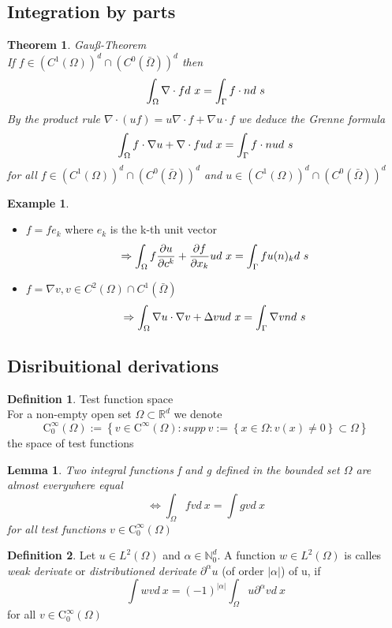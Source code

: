 \documentclass[ngerman]{article}
\newtheorem*{theorem}{Theorem}
\newtheorem*{lemma}{Lemma}
\theoremstyle{definition}
\newtheorem*{defi}{Definition}
\newtheorem*{exa}{Example}
\theoremstyle{remark}
\newcommand{\f}[2]{\frac{#1}{#2}}							%
\newcommand{\p}{\partial}
\newcommand{\NN}{\mathbb{N}}			%
\newcommand{\RR}{\mathbb{R}}			%
\renewcommand{\aa}{\alpha}		%
\newcommand{\OO}{\Omega}
\newcommand{\cinf}{\tx{C}^\infty}
\newcommand{\drw}{\Rightarrow}			%
\newcommand{\gdw}{\Leftrightarrow}	%
\newcommand{\tri}{\nabla}
\newcommand{\tx}[1]{\text{#1}}
\begin{document}
\subsection{Integration by parts}
\begin{theorem} Gau\ss{}-Theorem\\
  If $f \in(C^1(\OO))^d\cap (C^0(\bar\OO))^d$ then 
  $$\int_\OO \tri \cdot f d\ x = \int_\GG f \cdot n d\ s$$
  By the product rule $\tri \cdot (u f )= u \tri \cdot f + \tri u \cdot f$ we deduce the Grenne formula
  $$\int_\OO f \cdot \tri u + \tri \cdot f u d\ x = \int_\GG f \cdot n u d\ s$$
  for all $f \in(C^1(\OO))^d\cap (C^0(\bar\OO))^d$ and $u \in(C^1(\OO))^d\cap (C^0(\bar\OO))^d$
\end{theorem}
\begin{exa}
  \begin{itemize}
  \item $f=f e_k$ where $e_k$ is the k-th unit vector
    $$\drw \int_\OO f \f{\p u}{\p c^k}+ \f{\p f}{\p x_k} u d\ x = \int_\GG f u(n)_k d\ s$$
  \item $f = \nabla v, v \in C^2(\OO)\cap C^1(\bar\OO)$
    $$\drw \int_\OO \nabla u \cdot \nabla v + \Delta v u d\ x = \int_\GG \nabla v n d\ s$$
    
  \end{itemize}
\end{exa}
\subsection{Disribuitional derivations}
\begin{defi} Test function space\\
  For a non-empty open set $\OO \subset \RR^d$ we denote 
  $$\cinf_0 (\OO) := \left\{v \in \cinf(\OO) : supp\ v := \left\{x \in \OO: v(x)\neq 0 \right\} \subset \OO\right\}$$
  the space of test functions
\end{defi}
\begin{lemma}
  Two integral functions f and g defined in the bounded set $\OO$ are almost everywhere equal 
  $$\gdw \int_\OO f v d\ x = \int g v d\ x$$
  for all test functions $v \in \cinf_0(\OO	)$
\end{lemma}
\begin{defi}
  Let $u \in L^2(\OO)$ and $\aa \in \NN^d _0$. A function $w \in L^2(\OO)$ is calles \emph{weak derivate} or \emph{distributioned derivate} $\p^\aa u$ (of order $|\aa|$) of u, if 
  $$\int w v d\ x = (-1)^{|\aa|} \int _\OO u \p^\aa v d\ x$$
  for all $v \in \cinf_0(\OO)$

\end{defi}
\end{document}
